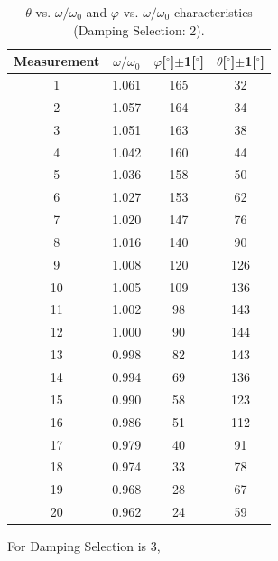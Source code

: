 \documentclass[a4paper]{report}
\begin{document}
	\begin{table}[H]
		\centering
		\setcounter{table}{6}
		\begin{tabular}{|c|c|c|c|}
			\hline
			Measurement&$\omega/\omega_0$&$\varphi$[$^\circ$]$\pm$1[$^\circ$]&$\theta$[$^\circ$]$\pm$1[$^\circ$]\\
			\hline
			1     & 1.061  & 165   & 32 \\
			\hline
			2     & 1.057  & 164   & 34 \\
			\hline
			3     & 1.051  & 163   & 38 \\
			\hline
			4     & 1.042  & 160   & 44 \\
			\hline
			5     & 1.036  & 158   & 50 \\
			\hline
			6     & 1.027  & 153   & 62 \\
			\hline
			7     & 1.020  & 147   & 76 \\
			\hline
			8     & 1.016  & 140   & 90 \\
			\hline
			9     & 1.008  & 120   & 126 \\
			\hline
			10    & 1.005  & 109   & 136 \\
			\hline
			11    & 1.002  & 98    & 143 \\
			\hline
			12    & 1.000  & 90    & 144 \\
			\hline
			13    & 0.998  & 82    & 143 \\
			\hline
			14    & 0.994  & 69    & 136 \\
			\hline
			15    & 0.990  & 58    & 123 \\
			\hline
			16    & 0.986  & 51    & 112 \\
			\hline
			17    & 0.979  & 40    & 91 \\
			\hline
			18    & 0.974  & 33    & 78 \\
			\hline
			19    & 0.968  & 28    & 67 \\
			\hline
			20    & 0.962  & 24    & 59 \\
			\hline
		\end{tabular}
		\caption{$\theta$ vs. $\omega/\omega_0$ and $\varphi$ vs. $\omega/\omega_0$ characteristics (Damping Selection: 2).}
	\end{table}
	
	For Damping Selection is 3,
	
\end{document}
